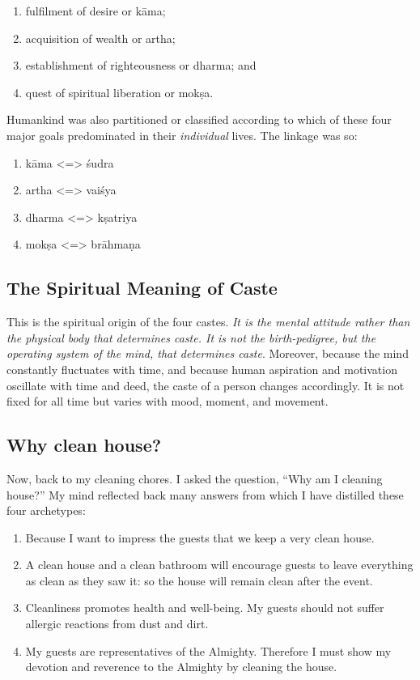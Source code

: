 \documentclass[
  a4paper,
]{article}
\begin{document}
\begin{enumerate}
\item
  fulfilment of desire or kāma;
\item
  acquisition of wealth or artha;
\item
  establishment of righteousness or dharma; and
\item
  quest of spiritual liberation or mokṣa.
\end{enumerate}

Humankind was also partitioned or classified according to which of these
four major goals predominated in their \emph{individual} lives. The
linkage was so:

\begin{enumerate}
\def\labelenumi{\arabic{enumi}.}
\item
  kāma \textless=\textgreater{} śudra
\item
  artha \textless=\textgreater{} vaiśya
\item
  dharma \textless=\textgreater{} kṣatriya
\item
  mokṣa \textless=\textgreater{} brāhmaṇa
\end{enumerate}

\subsection{The Spiritual Meaning of
Caste}\label{the-spiritual-meaning-of-caste}

This is the spiritual origin of the four castes. \emph{It is the mental
attitude rather than the physical body that determines caste. It is not
the birth-pedigree, but the operating system of the mind, that
determines caste}. Moreover, because the mind constantly fluctuates with
time, and because human aspiration and motivation oscillate with time
and deed, the caste of a person changes accordingly. It is not fixed for
all time but varies with mood, moment, and movement.

\subsection{Why clean house?}\label{why-clean-house}

Now, back to my cleaning chores. I asked the question, ``Why am I
cleaning house?'' My mind reflected back many answers from which I have
distilled these four archetypes:

\begin{enumerate}
\item
  Because I want to impress the guests that we keep a very clean house.
\item
  A clean house and a clean bathroom will encourage guests to leave
  everything as clean as they saw it: so the house will remain clean
  after the event.
\item
  Cleanliness promotes health and well-being. My guests should not
  suffer allergic reactions from dust and dirt.
\item
  My guests are representatives of the Almighty. Therefore I must show
  my devotion and reverence to the Almighty by cleaning the house.
\end{enumerate}
\end{document}
